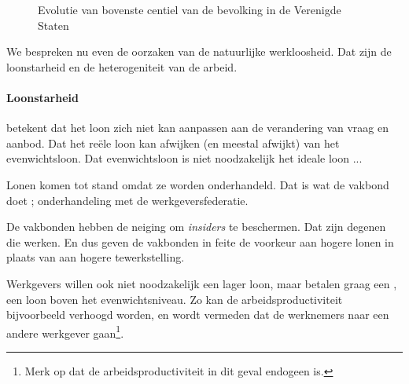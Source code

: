 \begin{figure}[H]
\small\centering\captionsetup{justification=centering,margin=2cm}
\caption{Evolutie van bovenste centiel van de bevolking in de Verenigde Staten}
\label{fig:h6werkloosheid}
\end{figure}

We bespreken nu even de oorzaken van de natuurlijke werkloosheid. Dat zijn de loonstarheid en de heterogeniteit van de arbeid.

\paragraph{Loonstarheid}

 betekent dat het loon zich niet kan aanpassen aan de verandering van vraag en aanbod. Dat het re\"ele loon kan afwijken (en meestal afwijkt) van het evenwichtsloon. Dat evenwichtsloon is niet noodzakelijk het ideale loon ... \\

\par Lonen komen tot stand omdat ze worden onderhandeld. Dat is wat de vakbond doet ; onderhandeling met de werkgeversfederatie. 
\par De vakbonden hebben de neiging om \textit{insiders} te beschermen. Dat zijn degenen die werken. En dus geven de vakbonden in feite de voorkeur aan hogere lonen in plaats van aan hogere tewerkstelling.
\par Werkgevers willen ook niet noodzakelijk een lager loon, maar betalen graag een , een loon boven het evenwichtsniveau. Zo kan de arbeidsproductiviteit bijvoorbeeld verhoogd worden, en wordt vermeden dat de werknemers naar een andere werkgever gaan\footnote{Merk op dat de arbeidsproductiviteit in dit geval endogeen is.}.\\

